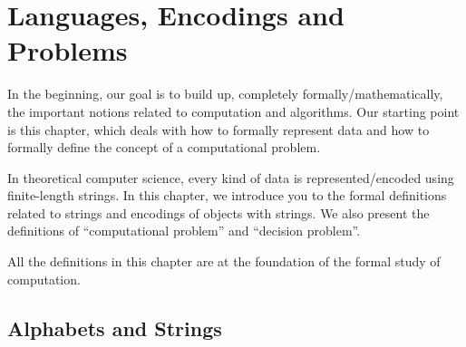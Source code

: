 
\chapter{Languages, Encodings and Problems}
\label{chapter:Languages-Encodings-and-Problems}

\begin{preamble}
In the beginning, our goal is to build up, completely formally/mathematically, the important notions related to computation and algorithms. Our starting point is this chapter, which deals with how to formally represent data and how to formally define the concept of a computational problem.

In theoretical computer science, every kind of data is represented/encoded using finite-length strings. In this chapter, we introduce you to the formal definitions related to strings and encodings of objects with strings. We also present the definitions of ``computational problem'' and ``decision problem''. 

All the definitions in this chapter are at the foundation of the formal study of computation.
\end{preamble}




\section{Alphabets and Strings}
\label{section:Alphabets-and-Strings}



